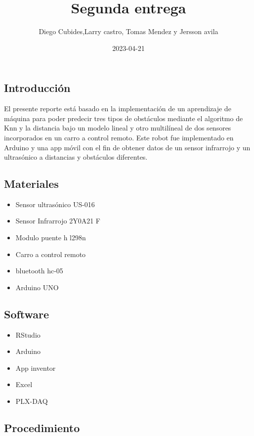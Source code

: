 \documentclass[
]{article}
\title{Segunda entrega}
\author{Diego Cubides,Larry castro, Tomas Mendez y Jersson avila}
\date{2023-04-21}
\providecommand{\tightlist}{%
  \setlength{\itemsep}{0pt}\setlength{\parskip}{0pt}}
\begin{document}
\maketitle

{
\setcounter{tocdepth}{3}
\tableofcontents
}
\hypertarget{introducciuxf3n}{%
\subsection{Introducción}\label{introducciuxf3n}}

El presente reporte está basado en la implementación de un aprendizaje
de máquina para poder predecir tres tipos de obstáculos mediante el
algoritmo de Knn y la distancia bajo un modelo lineal y otro multilíneal
de dos sensores incorporados en un carro a control remoto. Este robot
fue implementado en Arduino y una app móvil con el fin de obtener datos
de un sensor infrarrojo y un ultrasónico a distancias y obstáculos
diferentes.

\hypertarget{materiales}{%
\subsection{Materiales}\label{materiales}}

\begin{itemize}
\tightlist
\item
  Sensor ultrasónico US-016
\item
  Sensor Infrarrojo 2Y0A21 F
\item
  Modulo puente h l298n
\item
  Carro a control remoto
\item
  bluetooth hc-05
\item
  Arduino UNO
\end{itemize}

\hypertarget{software}{%
\subsection{Software}\label{software}}

\begin{itemize}
\tightlist
\item
  RStudio
\item
  Arduino
\item
  App inventor
\item
  Excel
\item
  PLX-DAQ
\end{itemize}

\hypertarget{procedimiento}{%
\subsection{Procedimiento}\label{procedimiento}}
\end{document}
